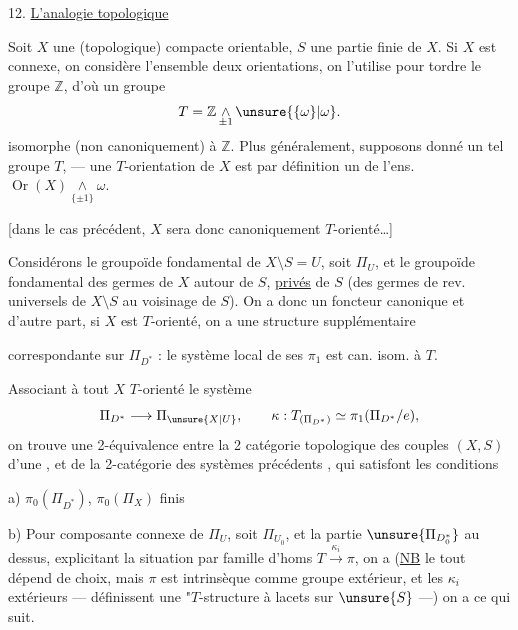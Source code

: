 12. \uline{L'analogie topologique}

Soit \(X\) une  (topologique) compacte
orientable, \(S\) une partie finie de \(X\). Si \(X\) est connexe, on considère
l'ensemble \inserted{\unsure{\(\omega\)}}  deux orientations,
on l'utilise pour tordre le groupe \(\mathbb Z\), d'où un groupe 
\[
T=\mathbb Z\mathop{\wedge}\limits_{\pm1}\unsure{\{\omega\}|\omega}.
\]
isomorphe (non canoniquement) à \(\mathbb Z\). Plus généralement, supposons
donné un tel groupe \(T\),
--- une \(T\)-orientation de \(X\) est par définition un 
de l'ens. \(\operatorname{Or}(X)\mathop{\wedge}\limits_{\{\pm1\}}\omega\).

[dans le cas précédent, \(X\) sera donc canoniquement \(T\)-orienté\ldots]

Considérons le groupoïde fondamental de \(X\setminus S=U\), soit \(\Pi_U\),
et le groupoïde fondamental  des germes
 de \(X\) autour de \(S\), \uline{privés} de \(S\)
(des germes de rev. universels de \(X\setminus S\) au voisinage de \(S\)).
On a donc un foncteur canonique
et d'autre part,  si \(X\) est \(T\)-orienté, on a une
structure supplémentaire


correspondante sur  \(\Pi_{D^*}\) : le système local de
ses \(\pi_1\) est can. isom. à \(T\).

Associant à tout \(X\) \(T\)-orienté le système
\[
\Pi_{D^*}\longrightarrow\Pi_{\unsure{X|U}},\qquad
\kappa:T_{(\Pi_{D^*})}\simeq\pi_1(\Pi_{D^*}/e),
\]
on trouve une 2-équivalence entre la 2 catégorie topologique des
 couples \((X,S)\) d'une
, et de la 2-catégorie des systèmes
précédents , \unsure{(}qui satisfont les conditions

a) \(\pi_0(\Pi_{D^*})\),  \(\pi_0(\Pi_X)\) finis

b) Pour  composante connexe de \(\Pi_U\), soit
\(\Pi_{U_0}\), et la partie \(\unsure{\Pi_{D_0^*}}\) au dessus, explicitant la
situation  par 
 famille d'homs
\(T\xrightarrow{\kappa_i}\pi\), on a (\uline{NB} le tout dépend de choix,
mais \(\pi\) est intrinsèque comme groupe extérieur, et les \(\kappa_i\)
 extérieurs --- définissent une "\(T\)-structure à lacets
sur \(\unsure{S}\) ---) on a ce qui suit.

